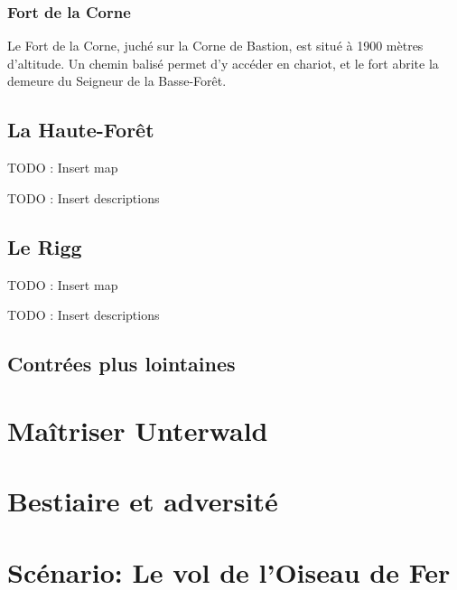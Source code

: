 \subsubsection*{Fort de la Corne}

Le Fort de la Corne, juché sur la Corne de Bastion, est situé à 1900 mètres d'altitude. Un chemin balisé permet d'y accéder en chariot, et le fort abrite la demeure du Seigneur de la Basse-Forêt.

\subsection{La Haute-Forêt}

TODO : Insert map

TODO : Insert descriptions

\subsection{Le Rigg}

TODO : Insert map

TODO : Insert descriptions

\subsection{Contrées plus lointaines}

\section{Maîtriser Unterwald}

\section{Bestiaire et adversité}

\section{Scénario: Le vol de l'Oiseau de Fer}